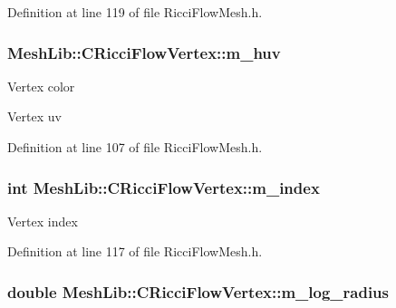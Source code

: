 Definition at line 119 of file Ricci\+Flow\+Mesh.\+h.

\subsubsection[{\texorpdfstring{m\+\_\+huv}{m_huv}}]{ Mesh\+Lib\+::\+C\+Ricci\+Flow\+Vertex\+::m\+\_\+huv\hspace{0.3cm}{\ttfamily [protected]}}\hypertarget{class_mesh_lib_1_1_c_ricci_flow_vertex_a674116f5178c06d98b5ef26deabdeec6}{}\label{class_mesh_lib_1_1_c_ricci_flow_vertex_a674116f5178c06d98b5ef26deabdeec6}
Vertex color

Vertex uv 

Definition at line 107 of file Ricci\+Flow\+Mesh.\+h.

\subsubsection[{\texorpdfstring{m\+\_\+index}{m_index}}]{\setlength{\rightskip}{0pt plus 5cm}int Mesh\+Lib\+::\+C\+Ricci\+Flow\+Vertex\+::m\+\_\+index\hspace{0.3cm}{\ttfamily [protected]}}\hypertarget{class_mesh_lib_1_1_c_ricci_flow_vertex_a7ab6932d891ddbb10c14f0ab984d3b36}{}\label{class_mesh_lib_1_1_c_ricci_flow_vertex_a7ab6932d891ddbb10c14f0ab984d3b36}
Vertex index 

Definition at line 117 of file Ricci\+Flow\+Mesh.\+h.

\subsubsection[{\texorpdfstring{m\+\_\+log\+\_\+radius}{m_log_radius}}]{\setlength{\rightskip}{0pt plus 5cm}double Mesh\+Lib\+::\+C\+Ricci\+Flow\+Vertex\+::m\+\_\+log\+\_\+radius\hspace{0.3cm}{\ttfamily [protected]}}\hypertarget{class_mesh_lib_1_1_c_ricci_flow_vertex_ac9f92366ddb0d823a6dfc6a526db9295}{}\label{class_mesh_lib_1_1_c_ricci_flow_vertex_ac9f92366ddb0d823a6dfc6a526db9295}


